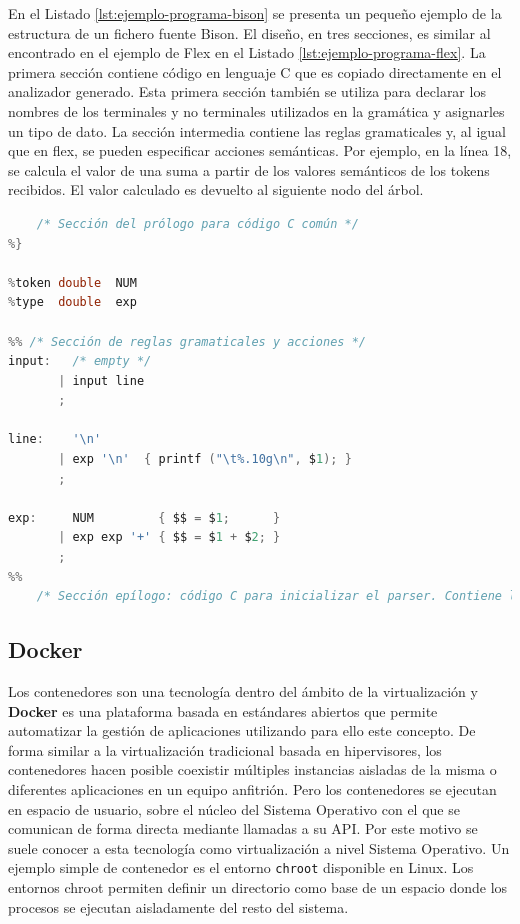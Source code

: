 En el Listado \ref{lst:ejemplo-programa-bison} se presenta un pequeño ejemplo de la estructura de un fichero fuente Bison. El diseño, en tres secciones, es similar al encontrado en el ejemplo de Flex en el Listado \ref{lst:ejemplo-programa-flex}. La primera sección contiene código en lenguaje C que es copiado directamente en el analizador generado. Esta primera sección también se utiliza para declarar los nombres de los terminales y no terminales utilizados en la gramática y asignarles un tipo de dato. La sección intermedia contiene las reglas gramaticales y, al igual que en flex, se pueden especificar acciones semánticas. Por ejemplo, en la línea 18, se calcula el valor de una suma a partir de los valores semánticos de los tokens recibidos. El valor calculado es devuelto al siguiente nodo del árbol.

\begin{lstlisting}[language=C,caption={Ejemplo de programa Bison \cite{mit_web_bisonExample}.},label=lst:ejemplo-programa-bison]
%{
    /* Sección del prólogo para código C común */
%}

%token double  NUM
%type  double  exp

%% /* Sección de reglas gramaticales y acciones */
input:   /* empty */
       | input line
       ;

line:    '\n'
       | exp '\n'  { printf ("\t%.10g\n", $1); }
       ;
    
exp:     NUM         { $$ = $1;      }
       | exp exp '+' { $$ = $1 + $2; }
       ;
%%
    /* Sección epílogo: código C para inicializar el parser. Contiene la función main() */
\end{lstlisting}

\subsection{Docker}

Los contenedores son una tecnología dentro del ámbito de la virtualización y \textbf{Docker} es una plataforma basada en estándares abiertos que permite automatizar la gestión de aplicaciones utilizando para ello este concepto. De forma similar a la virtualización tradicional basada en \gls{hipervisores}, los contenedores hacen posible coexistir múltiples instancias aisladas de la misma o diferentes aplicaciones en un  equipo anfitrión. Pero los contenedores se ejecutan en espacio de usuario, sobre el núcleo del Sistema Operativo con el que se comunican de forma directa mediante llamadas a su API. Por este motivo se suele conocer a esta tecnología como virtualización a nivel Sistema Operativo. Un ejemplo simple de contenedor es el entorno \verb|chroot| disponible en Linux. Los entornos chroot permiten definir un directorio como base de un espacio donde los procesos se ejecutan aisladamente del resto del sistema. 

